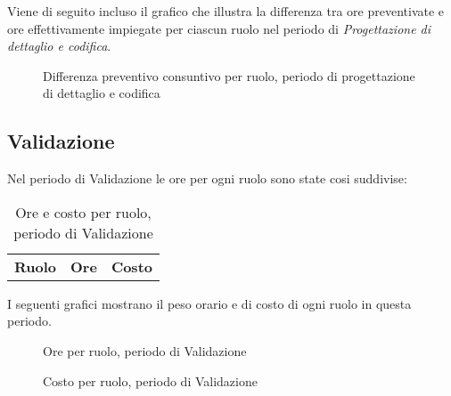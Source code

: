 Viene di seguito incluso il grafico che illustra la differenza tra ore preventivate e ore effettivamente impiegate per ciascun ruolo nel periodo di \textit{Progettazione di dettaglio e codifica}.

\begin{figure}[H]
\centering
{}
\caption{Differenza preventivo consuntivo per ruolo, periodo di progettazione di dettaglio e codifica}
\end{figure}

\subsection{Validazione}

Nel periodo di Validazione le ore per ogni ruolo sono state cosi suddivise:

\begin{table}[H]
	\centering
	\begin{tabular}{ l c c }
	\textbf{Ruolo} & \textbf{Ore} & \textbf{Costo} \\
	
		
	
	\end{tabular}
	\caption{Ore e costo per ruolo, periodo di Validazione}
	\end{table}

I seguenti grafici mostrano il peso orario e di costo di ogni ruolo in questa periodo.

\begin{figure}[H]
\begin{tikzpicture}

	

\end{tikzpicture}\caption{Ore per ruolo, periodo di Validazione}
\end{figure}

\begin{figure}[H]
\begin{tikzpicture}

	

\end{tikzpicture}
\caption{Costo per ruolo, periodo di Validazione}
\end{figure}

